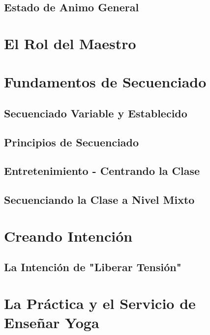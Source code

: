 \subsection{Estado de Animo General}
\section{El Rol del Maestro}
\section{Fundamentos de Secuenciado}
\subsection{Secuenciado Variable y Establecido}
\subsection{Principios de Secuenciado}
\subsection{Entretenimiento - Centrando la Clase}
\subsection{Secuenciando la Clase a Nivel Mixto}
\section{Creando Intención}
\subsection{La Intención de "Liberar Tensión"}
\section{La Práctica y el Servicio de Enseñar Yoga}


